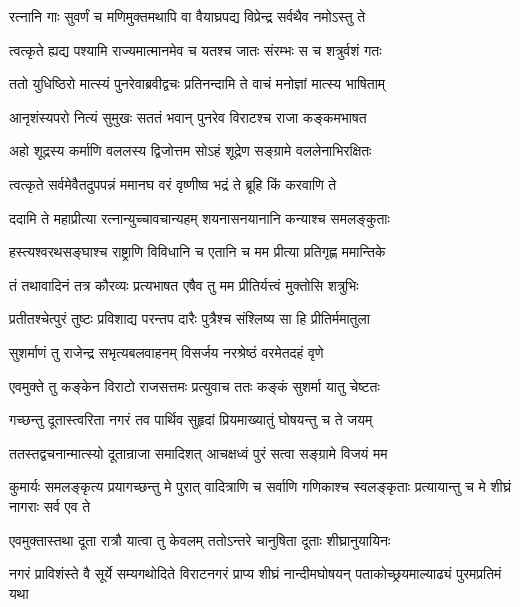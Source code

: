 \twolineshloka
{रत्नानि गाः सुवर्णं च मणिमुक्तमथापि वा}
{वैयाघ्रपद्य विप्रेन्द्र सर्वथैव नमोऽस्तु ते}


\twolineshloka
{त्वत्कृते ह्यद्य पश्यामि राज्यमात्मानमेव च}
{यतश्च जातः संरम्भः स च शत्रुर्वशं गतः}


\twolineshloka
{ततो युधिष्ठिरो मात्स्यं पुनरेवाब्रवीद्वचः}
{प्रतिनन्दामि ते वाचं मनोज्ञां मात्स्य भाषिताम्}


\twolineshloka
{आनृशंस्यपरो नित्यं सुमुखः सततं भवान्}
{पुनरेव विराटश्च राजा कङ्कमभाषत}


\twolineshloka
{अहो शूद्रस्य कर्माणि वललस्य द्विजोत्तम}
{सोऽहं शूद्रेण सङ्ग्रामे वललेनाभिरक्षितः}


\twolineshloka
{त्वत्कृते सर्वमेवैतदुपपन्नं ममानघ}
{वरं वृष्णीष्व भद्रं ते ब्रूहि किं करवाणि ते}


\twolineshloka
{ददामि ते महाप्रीत्या रत्नान्युच्चावचान्यहम्}
{शयनासनयानानि कन्याश्च समलङ्कुताः}


\twolineshloka
{हस्त्यश्वरथसङ्घाश्च राष्ट्राणि विविधानि च}
{एतानि च मम प्रीत्या प्रतिगृह्ण ममान्तिके}



\twolineshloka
{तं तथावादिनं तत्र कौरव्यः प्रत्यभाषत}
{एषैव तु मम प्रीतिर्यत्त्वं मुक्तोसि शत्रुभिः}


\twolineshloka
{प्रतीतश्चेत्पुरं तुष्टः प्रविशाद्य परन्तप}
{दारैः पुत्रैश्च संश्लिष्य सा हि प्रीतिर्ममातुला}


\twolineshloka
{सुशर्माणं तु राजेन्द्र सभृत्यबलवाहनम्}
{विसर्जय नरश्रेष्ठं वरमेतदहं वृणे}



\twolineshloka
{एवमुक्ते तु कङ्केन विराटो राजसत्तमः}
{प्रत्युवाच ततः कङ्कं सुशर्मा यातु चेष्टतः}




\twolineshloka
{गच्छन्तु दूतास्त्वरिता नगरं तव पार्थिव}
{सुहृदां प्रियमाख्यातुं घोषयन्तु च ते जयम्}


\twolineshloka
{ततस्तद्वचनान्मात्स्यो दूतान्राजा समादिशत्}
{आचक्षध्वं पुरं सत्वा सङ्ग्रामे विजयं मम}


\threelineshloka
{कुमार्यः समलङ्कृत्य प्रयागच्छन्तु मे पुरात्}
{वादित्राणि च सर्वाणि गणिकाश्च स्वलङ्कृताः}
{प्रत्यायान्तु च मे शीघ्रं नागराः सर्व एव ते}


\twolineshloka
{एवमुक्तास्तथा दूता रात्रौ यात्वा तु केवलम्}
{ततोऽन्तरे चानुषिता दूताः शीघ्रानुयायिनः}


\threelineshloka
{नगरं प्राविशंस्ते वै सूर्ये सम्यगथोदिते}
{विराटनगरं प्राप्य शीघ्रं नान्दीमघोषयन्}
{पताकोच्छ्रयमाल्याढ्यं पुरमप्रतिमं यथा}

